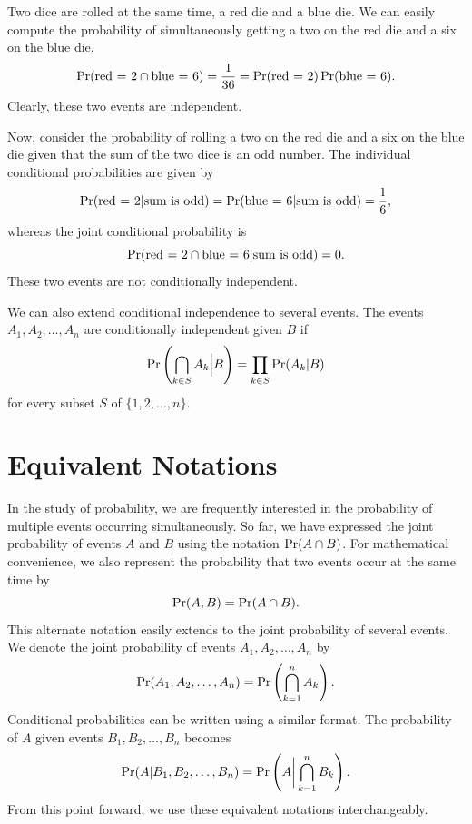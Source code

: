\begin{example}
Two dice are rolled at the same time, a red die and a blue die.
We can easily compute the probability of simultaneously getting a two on the red die and a six on the blue die,
\begin{equation*}
\Pr (\text{red = 2} \cap \text{blue = 6}) = \frac{1}{36}
= \Pr (\text{red = 2}) \Pr (\text{blue = 6}) .
\end{equation*}
Clearly, these two events are independent.

Now, consider the probability of rolling a two on the red die and a six on the blue die given that the sum of the two dice is an odd number.
The individual conditional probabilities are given by
\begin{equation*}
\Pr (\text{red = 2} | \text{sum is odd})
= \Pr (\text{blue = 6} | \text{sum is odd})
= \frac{1}{6},
\end{equation*}
whereas the joint conditional probability is
\begin{equation*}
\Pr (\text{red = 2} \cap \text{blue = 6} | \text{sum is odd})
= 0 .
\end{equation*}
These two events are not conditionally independent.
\end{example}

We can also extend conditional independence to several events.
The events $A_1, A_2, \ldots, A_n$ are conditionally independent given $B$ if
\begin{equation*}
\Pr \left( \bigcap_{k \in S} A_k \Big| B \right)
= \prod_{k \in S} \Pr (A_k | B)
\end{equation*}
for every subset $S$ of $\{1, 2, \ldots, n\}$.


\section{Equivalent Notations}

In the study of probability, we are frequently interested in the probability of multiple events occurring simultaneously.
So far, we have expressed the joint probability of events $A$ and $B$ using the notation $\Pr (A \cap B)$.
For mathematical convenience, we also represent the probability that two events occur at the same time by
\begin{equation*}
\Pr (A, B) = \Pr (A \cap B) .
\end{equation*}
This alternate notation easily extends to the joint probability of several events.
We denote the joint probability of events $A_1, A_2, \ldots, A_n$ by
\begin{equation*}
\Pr (A_1, A_2, \ldots, A_n) =
\Pr \left( \bigcap_{k=1}^n A_k \right) .
\end{equation*}
Conditional probabilities can be written using a similar format.
The probability of $A$ given events $B_1, B_2, \ldots, B_n$ becomes
\begin{equation*}
\Pr (A | B_1, B_2, \ldots, B_n) =
\Pr \left( A \bigg| \bigcap_{k=1}^n B_k \right) .
\end{equation*}
From this point forward, we use these equivalent notations interchangeably.
